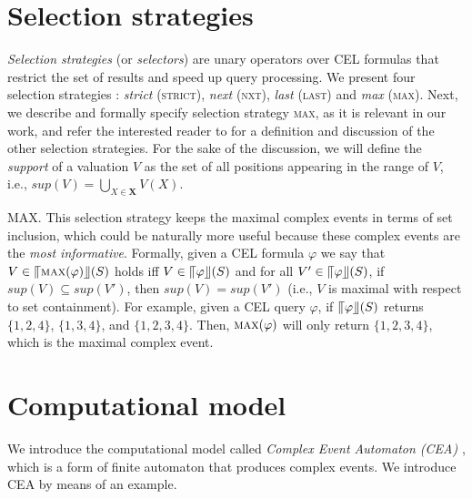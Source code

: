 \section{Selection strategies}\label{sec:selection_strategies}

\emph{Selection strategies} (or \emph{selectors}) are unary operators over CEL formulas that restrict the set of results and speed up query processing. We present four selection strategies \cite{formal-framework-cep,formal-framework-cer}: \emph{strict} (\textsc{strict}), \emph{next} (\textsc{nxt}), \emph{last} (\textsc{last}) and \emph{max} (\textsc{max}). Next, we describe and formally specify selection strategy \textsc{max}, as it is relevant in our work, and refer the interested reader to \cite{formal-framework-cer} for a definition and discussion of the other selection strategies. For the sake of the discussion, we will define the \emph{support} of a valuation $V$ as the set of all positions appearing in the range of $V$, i.e., $sup(V) = \bigcup\limits_{X \in \textbf{X}}V(X)$.

\textsc{MAX}. This selection strategy keeps the maximal complex events in terms of set inclusion, which could be naturally more useful because these complex events are the \emph{most informative}. Formally, given a CEL formula $\varphi$ we say that $V \in \llceil \textsc{max}(\varphi) \rrfloor(S)$ holds iff $V \in \llceil \varphi \rrfloor(S)$ and for all $V' \in \llceil \varphi \rrfloor(S)$, if $sup(V) \subseteq sup(V')$, then $sup(V) = sup(V')$ (i.e., $V$ is maximal with respect to set containment). For example, given a CEL query $\varphi$, if $\llceil \varphi \rrfloor(S)$ returns $\{ 1,2,4\}$, $\{1,3,4\}$, and $\{1,2,3,4\}$. Then, $\textsc{max}(\varphi)$ will only return $\{ 1, 2, 3, 4\}$, which is the maximal complex event.

\section{Computational model}\label{sec:cea}

We introduce the computational model called \emph{Complex Event Automaton (CEA)} \cite{formal-framework-cep}, which is a form of finite automaton that produces complex events. We introduce CEA by means of an example.

